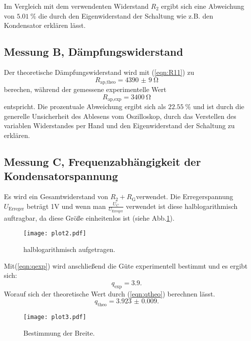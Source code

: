 Im Vergleich mit dem verwendenten Widerstand $R_{\text{2}}$ ergibt sich eine Abweichung
von $\SI{5.01}{\percent}$ die durch den Eigenwiderstand der Schaltung wie z.B. den Kondensator
erklären lässt.

\subsection{Messung B, Dämpfungswiderstand}
Der theoretische Dämpfungswiderstand wird mit (\ref{eqn:R11}) zu
\begin{equation*}
  R_{\text{ap,theo}} = \SI{4390(9)}{\ohm}
\end{equation*}
  berechen, während der gemessene experimentelle Wert
\begin{equation*}
  R_{\text{ap,exp}} = \SI{3400}{\ohm}
\end{equation*}
entspricht.
Die prozentuale Abweichung ergibt sich als $\SI{22.55}{\percent}$ und ist durch
die generelle Unsicherheit des Ablesens vom Oszilloskop, durch das Verstellen
des variablen Widerstandes per Hand und den Eigenwiderstand der Schaltung  zu erklären.

\subsection{Messung C, Frequenzabhängigkeit der Kondensatorspannung}

Es wird ein Gesamtwiderstand von $R_\text{2} + R_\text{G} $verwendet.
Die Erregerspannung $U_{\text{Erreger}}$ beträgt 1V und wenn man $\frac{U_{C}}{U_{\text{Erreger}}}$
verwendet ist diese halblogarithmisch auftragbar, da diese Größe einheitenlos ist (siehe Abb.\ref{fig:plot2}).

\begin{figure}
  \centering
  \texttt{[image: plot2.pdf]}
  \caption{halblogarithmisch aufgetragen.}
  \label{fig:plot2}
\end{figure}

Mit(\ref{eqn:qexp}) wird anschließend die Güte experimentell bestimmt und es ergibt sich:
\begin{equation*}
  q_{\text{exp}} = 3.9.
\end{equation*}
Worauf sich der theoretische Wert durch (\ref{eqn:qtheo}) berechnen lässt.
\begin{equation*}
  q_{\text{theo}} = \num{3.923(9)}.
\end{equation*}

\begin{figure}
  \centering
  \texttt{[image: plot3.pdf]}
  \caption{Bestimmung der Breite.}
  \label{fig:plot3}
\end{figure}

